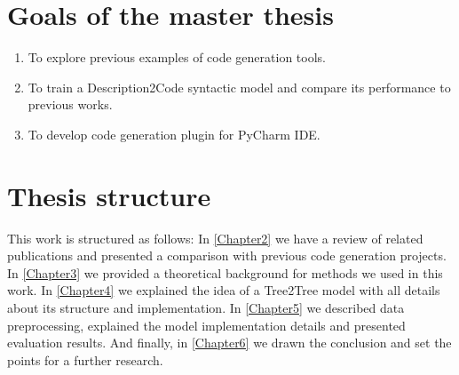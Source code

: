 \section{Goals of the master thesis}

\begin{enumerate}
	\item To explore previous examples of code generation tools.
	\item To train a Description2Code syntactic model and compare its performance to previous works.
	\item To develop code generation plugin for PyCharm IDE.
\end{enumerate}

\section{Thesis structure}
This work is structured as follows: In \cref{Chapter2} we have a review of related publications and presented a comparison with previous code generation projects. In \cref{Chapter3} we provided a theoretical background for methods we used in this work. In \cref{Chapter4} we explained the idea of a Tree2Tree model with all details about its structure and implementation. In  \cref{Chapter5} we described data preprocessing, explained the model implementation details and presented evaluation results. And finally, in \cref{Chapter6} we drawn the conclusion and set the points for a further research.